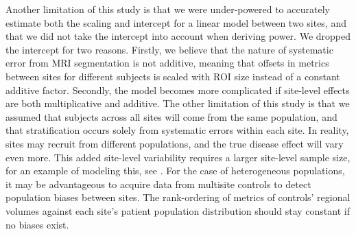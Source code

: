 Another limitation of this study is that we were under-powered to accurately estimate both the scaling and intercept for a linear model between two sites, and that we did not take the intercept into account when deriving power. We dropped the intercept for two reasons. Firstly, we believe that the nature of systematic error from MRI segmentation is not additive, meaning that offsets in metrics between sites for different subjects is scaled with ROI size instead of a constant additive factor. Secondly, the model becomes more complicated if site-level effects are both multiplicative and additive. The other limitation of this study is that we assumed that subjects across all sites will come from the same population, and that stratification occurs solely from systematic errors within each site. In reality, sites may recruit from different populations, and the true disease effect will vary even more. This added site-level variability requires a larger site-level sample size, for an example of modeling this, see \cite{enigmarandom}. For the case of heterogeneous populations, it may be advantageous to acquire data from multisite controls to detect population biases between sites. The rank-ordering of metrics of controls' regional volumes against each site's patient population distribution should stay constant if no biases exist.